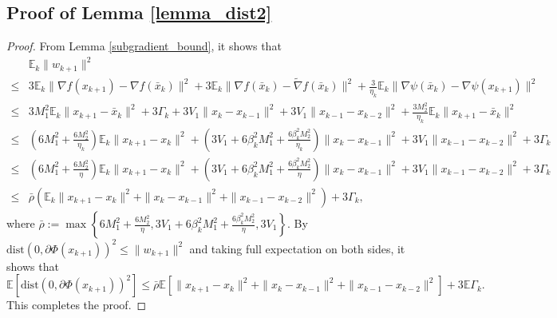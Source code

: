 \documentclass[letterpaper]{article} %
\begin{document}
	\subsection{Proof of  Lemma \ref{lemma_dist2}}
	\begin{proof}
		From Lemma \ref{subgradient_bound}, it shows that
		\begin{align*}
			&\mathbb{E}_{k}\|w_{k+1}\|^{2}\\
			\le&3\mathbb{E}_{k}\|\nabla f(x_{k+1})-\nabla f(\bar{x}_{k})\|^{2}+3\mathbb{E}_{k}\|\nabla f(\bar{x}_{k})-\tilde{\nabla} f(\bar{x}_{k})\|^{2}
			+\frac{3}{\eta_{k}}\mathbb{E}_{k}\|\nabla \psi(\bar{x}_{k})-\nabla \psi(x_{k+1})\|^{2}\\
			\le&3M_{1}^{2}\mathbb{E}_{k}\|x_{k+1}-\bar{x}_{k}\|^2+3\Gamma_{k}+3V_{1}\|x_{k}-x_{k-1}\|^{2}+3V_{1}\|x_{k-1}-x_{k-2}\|^{2}
			+\frac{3M_{2}^{2}}{\eta_{k}}\mathbb{E}_{k}\|x_{k+1}-\bar{x}_{k}\|^{2}\\
			\le& \left(6M_{1}^{2}+\frac{6M_{2}^{2}}{\eta_{k}}\right)\mathbb{E}_{k}\|x_{k+1}-x_{k}\|^{2}+\left(3V_{1}+6\beta_{k}^{2}M_{1}^{2}+\frac{6\beta_{k}^{2}M_{2}^{2}}{\eta_{k}}\right)\|x_{k}-x_{k-1}\|^{2}
			+3V_{1}\|x_{k-1}-x_{k-2}\|^{2}+3\Gamma_{k}\\
			\le&\left(6M_{1}^{2}+\frac{6M_{2}^{2}}{\eta}\right)\mathbb{E}_{k}\|x_{k+1}-x_{k}\|^{2}+\left(3V_{1}+6\beta_{k}^{2}M_{1}^{2}+\frac{6\beta_{k}^{2}M_{2}^{2}}{\eta}\right)\|x_{k}-x_{k-1}\|^{2}
			+3V_{1}\|x_{k-1}-x_{k-2}\|^{2}+3\Gamma_{k}\\
			\le& \bar{\rho}(\mathbb{E}_{k}\|x_{k+1}-x_{k}\|^{2}+\|x_{k}-x_{k-1}\|^{2}+\|x_{k-1}-x_{k-2}\|^{2}) +3\Gamma_{k},
		\end{align*}
		where $\bar{\rho}:=\max\left\{6M_{1}^{2}+\frac{6M_{2}^{2}}{\eta}, 3V_{1}+6\beta_{k}^{2}M_{1}^{2}+\frac{6\beta_{k}^{2}M_{2}^{2}}{\eta}, 3V_{1}\right\}$. By $\mathrm{dist}(0,\partial\Phi(x_{k+1}))^{2}\le\|w_{k+1}\|^{2}$ and taking full expectation on both sides, it shows that
		\[
		\mathbb{E}[\mathrm{dist}(0,\partial\Phi(x_{k+1}))^{2}]\le \bar{\rho}\mathbb{E}[\|x_{k+1}-x_{k}\|^{2}+\|x_{k}-x_{k-1}\|^{2}+\|x_{k-1}-x_{k-2}\|^{2}] +3\mathbb{E}\Gamma_{k}.
		\]
		This completes the proof.
	\end{proof}
	
\end{document}
